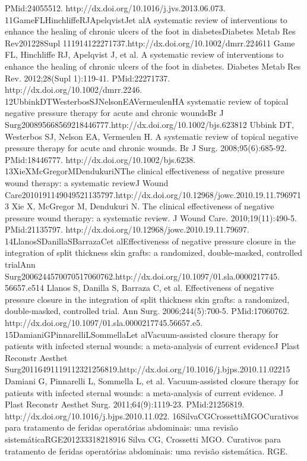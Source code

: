 \documentclass[numberinsection,times,10pt,spreadimages]{memoir}
\begin{document}
PMid:24055512. http://dx.doi.org/10.1016/j.jvs.2013.06.073.
11GameFLHinchliffeRJApelqvistJet alA systematic review of interventions to
enhance the healing of
chronic ulcers of the foot in diabetesDiabetes Metab Res Rev201228Supl
111914122271737.http://dx.doi.org/10.1002/dmrr.224611 Game FL, Hinchliffe RJ,
Apelqvist J, et al. A systematic review
of interventions to enhance the healing of chronic ulcers of the foot in
diabetes. Diabetes Metab Res Rev. 2012;28(Supl 1):119-41. PMid:22271737.
http://dx.doi.org/10.1002/dmrr.2246. 12UbbinkDTWesterbosSJNelsonEAVermeulenHA
systematic review of topical negative pressure therapy for
acute and chronic woundsBr J
Surg200895668569218446777.http://dx.doi.org/10.1002/bjs.623812 Ubbink DT,
Westerbos SJ, Nelson EA, Vermeulen H. A systematic
review of topical negative pressure therapy for acute and chronic wounds. Br J
Surg. 2008;95(6):685-92. PMid:18446777. http://dx.doi.org/10.1002/bjs.6238.
13XieXMcGregorMDendukuriNThe clinical effectiveness of negative pressure wound
therapy: a
systematic reviewJ Wound
Care2010191149049521135797.http://dx.doi.org/10.12968/jowc.2010.19.11.7969713
Xie X, McGregor M, Dendukuri N. The clinical effectiveness of
negative pressure wound therapy: a systematic review. J Wound Care.
2010;19(11):490-5. PMid:21135797.
http://dx.doi.org/10.12968/jowc.2010.19.11.79697.
14LlanosSDanillaSBarrazaCet alEffectiveness of negative pressure closure in the
integration of
split thickness skin grafts: a randomized, double-masked, controlled
trialAnn Surg2006244570070517060762.http://dx.doi.org/10.1097/01.sla.0000217745.
56657.e514 Llanos S, Danilla S, Barraza C, et al. Effectiveness of negative
pressure closure in the integration of split thickness skin grafts: a
randomized, double-masked, controlled trial. Ann Surg. 2006;244(5):700-5.
PMid:17060762. http://dx.doi.org/10.1097/01.sla.0000217745.56657.e5.
15DamianiGPinnarelliLSommellaLet alVacuum-assisted closure therapy for patients
with infected
sternal wounds: a meta-analysis of current evidenceJ Plast Reconstr Aesthet
Surg20116491119112321256819.http://dx.doi.org/10.1016/j.bjps.2010.11.02215
Damiani G, Pinnarelli L, Sommella L, et al. Vacuum-assisted
closure therapy for patients with infected sternal wounds: a meta-analysis of
current evidence. J Plast Reconstr Aesthet Surg. 2011;64(9):1119-23.
PMid:21256819. http://dx.doi.org/10.1016/j.bjps.2010.11.022.
16SilvaCGCrossettiMGOCurativos para tratamento de feridas operatórias
abdominais: uma
revisão sistemáticaRGE201233318218916 Silva CG, Crossetti MGO. Curativos para
tratamento de feridas
operatórias abdominais: uma revisão sistemática. RGE.
\end{document}
